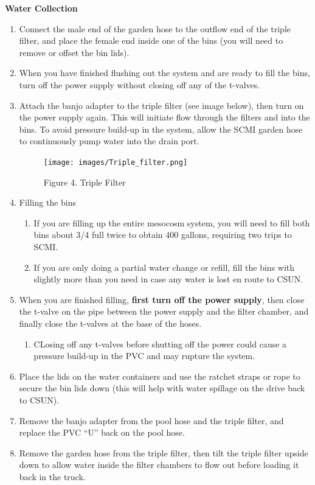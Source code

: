 \documentclass[
]{book}
\providecommand{\tightlist}{%
  \setlength{\itemsep}{0pt}\setlength{\parskip}{0pt}}
\begin{document}
\textbf{Water Collection}

\begin{enumerate}
\def\labelenumi{\arabic{enumi}.}
\item
  Connect the male end of the garden hose to the outflow end of the triple filter, and place the female end inside one of the bins (you will need to remove or offset the bin lids).
\item
  When you have finished flushing out the system and are ready to fill the bins, turn off the power supply without closing off any of the t-valves.
\item
  Attach the banjo adapter to the triple filter (see image below), then turn on the power supply again. This will initiate flow through the filters and into the bins. To avoid pressure build-up in the system, allow the SCMI garden hose to continuously pump water into the drain port.

  \begin{figure}
  \centering
  \texttt{[image: images/Triple\_filter.png]}
  \caption{Figure 4. Triple Filter}
  \end{figure}
\item
  Filling the bins

  \begin{enumerate}
  \def\labelenumii{\arabic{enumii}.}
  \tightlist
  \item
    If you are filling up the entire mesocosm system, you will need to fill both bins about 3/4 full twice to obtain 400 gallons, requiring two trips to SCMI.
  \item
    If you are only doing a partial water change or refill, fill the bins with slightly more than you need in case any water is lost en route to CSUN.
  \end{enumerate}
\item
  When you are finished filling, \textbf{first turn off the power supply}, then close the t-valve on the pipe between the power supply and the filter chamber, and finally close the t-valves at the base of the hoses.

  \begin{enumerate}
  \def\labelenumii{\arabic{enumii}.}
  \tightlist
  \item
    CLosing off any t-valves before shutting off the power could cause a pressure build-up in the PVC and may rupture the system.
  \end{enumerate}
\item
  Place the lids on the water containers and use the ratchet straps or rope to secure the bin lids down (this will help with water spillage on the drive back to CSUN).
\item
  Remove the banjo adapter from the pool hose and the triple filter, and replace the PVC ``U'' back on the pool hose.
\item
  Remove the garden hose from the triple filter, then tilt the triple filter upside down to allow water inside the filter chambers to flow out before loading it back in the truck.
\end{enumerate}
\end{document}
